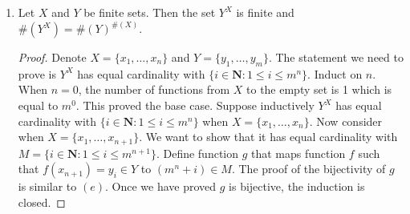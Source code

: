 \documentclass[12pt, letter]{article}
\begin{document}
\begin{enumerate}
\begin{proof}
        For any $j\in\{i\in\mathbf{N}:1\leq i\leq nm\}$, by induction hypothesis, there exists a bijective function $h$ from $X\times Y$ to $\{i\in\mathbf{N}:1\leq i\leq nm\}$, so there exists some $x\in X$,
        $y\in Y$ such that $h(x,y)=j$. Let $g(x,y)=h(x,y)=j$ for $x\in X-\{x_{n+1}\}$ and $y\in Y$. For any $j\in\{i\in\mathbf{N}:nm+1\leq i\leq (n+1)m\}$, we have $g(n+1,j-nm)$. Thus, function $g$ is surjective. 
        Suppose $x_1,x_2\in X-\{x_{n+1}\}$, $y_1,y_2\in Y$, $(x_1,y_1)\ne(x_2,y_2)$, by induction hypothesis, $g(x_1,y_1)\ne g(x_2,y_2)$. 
        For $x_1\in X-\{x_{n+1}\}$, $x_2=x_{n+1}$, $y_1,y_2\in Y$, we have $g(x_1,y_1)\leq nm$ and $g(x_2,y_2)>nm$. So $g(x_1,y_1)\ne g(x_2,y_2)$. For $x_1=x_2=x_{n+1}$ and $y_1,y_2\in Y, y_1\ne y_2$, by definition, $g(x_1,y_1)\ne g(x_2,y_2)$. 
        Thus, $g$ is injective. So $g$ is bijective and thus $\#(X\times Y)$ has equal cardinality with $\{i\in\mathbf{N}:1\leq i\leq (n+1)m\}$.
    \end{proof}
    \item Let $X$ and $Y$ be finite sets. Then the set $Y^X$ is finite and $\#(Y^X)=\#(Y)^{\#(X)}$.
    \begin{proof}
        Denote $X=\{x_1,\dotsc,x_n\}$ and $Y=\{y_1,\dotsc,y_m\}$. The statement we need to prove is $Y^X$ has equal cardinality with $\{i\in\mathbf{N}:1\leq i\leq m^n\}$. Induct on $n$. When $n=0$, the number of functions from $X$ to the empty set is 1 which is equal 
        to $m^0$. This proved the base case. Suppose inductively $Y^X$ has equal cardinality with $\{i\in\mathbf{N}:1\leq i\leq m^n\}$ when $X=\{x_1,\dotsc,x_n\}$. Now consider when $X=\{x_1,\dotsc,x_{n+1}\}$. We want to show that it has equal cardinality with $M=\{i\in\mathbf{N}:1\leq i\leq m^{n+1}\}$.
        Define function $g$ that maps function $f$ such that $f(x_{n+1})=y_i\in Y$ to $(m^n+i)\in M$. The proof of the bijectivity of $g$ is similar to $(e)$. Once we have proved $g$ is bijective,
        the induction is closed. 
    \end{proof}
\end{enumerate}
\end{document}
